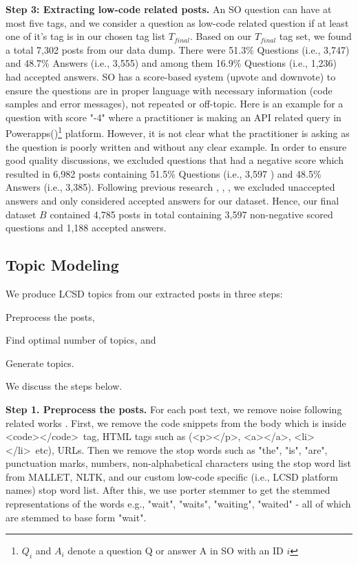 \nd\textbf{Step 3: Extracting low-code related posts.}
An SO question can have at most five tags, and we consider a question as low-code related question if at least one of it's tag is in our chosen tag list $T_{final}$. Based on our $T_{final}$ tag set, we found a total 7,302 posts from our data dump. There were 51.3\% Questions (i.e., 3,747) and 48.7\% Answers (i.e., 3,555) and among them 16.9\% Questions (i.e., 1,236) had accepted answers. SO has a score-based system (upvote and downvote) to ensure the questions are in proper language with necessary information (code samples and error messages), not repeated or off-topic. Here is an example for a question with score "-4" where a practitioner is making an API related query in Powerapps()\footnote{$Q_i$ and $A_i$ denote a question Q or answer A in SO with an ID $i$} platform. However, it is not clear what the practitioner is asking as the question is poorly written and without any clear example. In order to ensure good quality discussions, we excluded questions that had a negative score which resulted in 6,982 posts containing 51.5\% Questions (i.e., 3,597 ) and 48.5\% Answers (i.e., 3,385). Following previous research \cite{bagherzadeh2019going}, \cite{rosen2016mobile}, \cite{barua2014developers}, we excluded unaccepted answers and only considered accepted answers for our dataset. Hence, our final dataset $B$ contained  4,785 posts in total containing 3,597 non-negative scored questions and 1,188 accepted answers. 



\subsection{Topic Modeling} \label{topic_modeling}
We produce  LCSD topics from our extracted posts in three steps: \begin{inparaenum}[(1)]
\item Preprocess the posts, 
\item Find optimal number of topics, and
\item Generate topics.
\end{inparaenum} We discuss the steps below.

\nd\textbf{Step 1. Preprocess the posts.} For each post text, we remove noise following related works \cite{abdellatif2020challenges,bagherzadeh2019going,barua2014developers}. First, we remove the code snippets from the body which is inside \textless code\textgreater \textless /code\textgreater\ tag, HTML tags such as (\textless p\textgreater \textless /p\textgreater, \textless a\textgreater \textless /a\textgreater, \textless li\textgreater \textless /li\textgreater\ etc), URLs. Then we remove the stop words such as "the", "is", "are", punctuation marks, numbers, non-alphabetical characters using the stop word list from MALLET\cite{mccallum2002mallet}, NLTK\cite{loper2002nltk}, and our custom low-code specific (i.e.,  LCSD platform names) stop word list. After this, we use porter stemmer\cite{ramasubramanian2013effective} to get the stemmed representations of the words e.g., "wait", "waits", "waiting", "waited" - all of which are stemmed to base form "wait".

